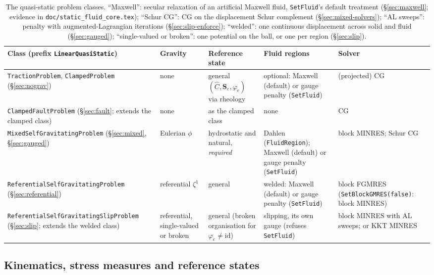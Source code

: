 \documentclass[11pt]{article}
\numberwithin{equation}{section}
\theoremstyle{remark}
\newcommand{\Ch}{\hat{C}}
\newcommand{\Se}{\mathbf{S}_e}
\newcommand{\code}[1]{\texttt{#1}}
\begin{document}
\begin{table}[h]
\centering
\footnotesize
\begin{tabular}{@{}P{4.4cm}P{2.0cm}P{2.8cm}P{2.6cm}P{2.6cm}@{}}
\toprule
Class (prefix \code{LinearQuasiStatic}) & Gravity & Reference state & Fluid regions & Solver \\
\midrule
\code{TractionProblem}, \code{ClampedProblem} (\S\ref{sec:nograv})
  & none & general $(\Ch,\Se,\varphi_e)$ via rheology & optional: Maxwell (default) or gauge penalty (\code{SetFluid}) & (projected) CG \\
\code{ClampedFaultProblem} (\S\ref{sec:fault}; extends the clamped class)
  & none & as the clamped class & none & CG \\
\code{MixedSelfGravitating\-Problem} (\S\ref{sec:mixed}, \S\ref{sec:gauged})
  & Eulerian $\phi$ & hydrostatic and natural, \emph{required} & Dahlen (\code{FluidRegion}); Maxwell (default) or gauge penalty (\code{SetFluid}) & block MINRES; Schur CG \\
\code{ReferentialSelf\-GravitatingProblem} (\S\ref{sec:referential})
  & referential $\zeta^1$ & general & welded: Maxwell (default) or gauge penalty (\code{SetFluid}) & block FGMRES (\code{SetBlockGMRES(false)}: block MINRES) \\
\code{ReferentialSelf\-GravitatingSlipProblem} (\S\ref{sec:slip}; extends the welded class)
  & referential, single-valued or broken & general (broken organisation for $\varphi_e\neq\mathrm{id}$) & slipping, its own gauge (refuses \code{SetFluid}) & block MINRES with AL sweeps; or KKT MINRES \\
\bottomrule
\end{tabular}
\caption{The quasi-static problem classes. ``Maxwell'': secular
relaxation of an artificial Maxwell fluid, \code{SetFluid}'s default
treatment (\S\ref{sec:maxwell}; evidence in
\code{doc/static\_fluid\_core.tex}); ``Schur CG'': CG on the
displacement Schur complement (\S\ref{sec:mixed-solvers}); ``AL sweeps'':
penalty with augmented-Lagrangian iterations (\S\ref{sec:slip-enforce}); ``welded'':
one continuous displacement across solid and fluid (\S\ref{sec:gauged});
``single-valued or broken'': one potential on the ball, or one per region
(\S\ref{sec:slip}).}
\label{tab:grid}
\end{table}

\subsection{Kinematics, stress measures and reference states}
\label{sec:refstate}
\end{document}
